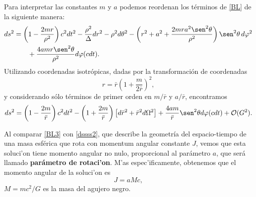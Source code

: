 Para interpretar las constantes $m$ y $a$ podemos reordenan los t\'erminos de \eqref{BL} de la siguiente manera:
\begin{equation}
\begin{aligned}\label{BL2}
ds^2&=\left(1-\frac{2mr}{\rho^2}\right)c^2dt^2-\frac{\rho^2}{\Delta}dr^2-\rho^2d\theta^2-\left(r^2+a^2+\frac{2mra^2\sen^2 \theta}{\rho^2}\right)\sen^2\theta\,d\varphi^2\\
&\qquad+\frac{4amr\sen^2\theta}{\rho^2}d\varphi(cdt) .
\end{aligned}
\end{equation}
Utilizando coordenadas isotr\'opicas, dadas por la transformaci\'on de coordenadas
\begin{equation}
r=\bar{r}\left(1+\frac{m}{2\bar{r}}\right)^2,
\end{equation}
y considerando s\'olo t\'erminos de primer orden en $m/\bar{r}$ y $a/\bar{r}$, encontramos
\begin{equation}
ds^2 =\left(1-\frac{2m}{\bar{r}} \right)c^2dt^2-\left(1+\frac{2m}{\bar{r}} \right)\left[d\bar{r}^2+\bar{r}^2d\Omega^2\right]+\frac{4am}{\bar{r}}\sen^2\theta d\varphi(cdt)+\mathcal{O}(G^2) .\label{BL3}
\end{equation}

Al comparar \eqref{BL3} con \eqref{dssss2}, que describe la geometr\'ia del espacio-tiempo de una masa esf\'erica que rota con momentum angular constante $J$, vemos que esta soluci'on tiene momento angular no nulo, proporcional al par\'ametro $a$, que ser\'a llamado \textbf{par\'ametro de rotaci'on}. M'as espec'ificamente, obtenemos que el momento angular de la soluci'on es
\begin{equation}
J=aMc,
\end{equation}
$M=mc^2/G$ es la masa del agujero negro.
%

